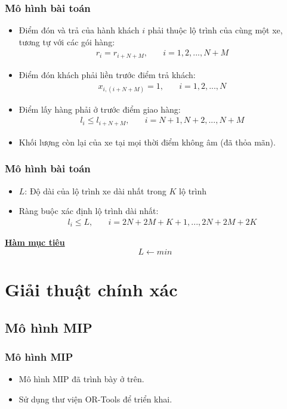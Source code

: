 \documentclass{beamer}
\begin{document}
	\begin{frame}
		\frametitle{Mô hình bài toán}
		\begin{itemize}
			\item Điểm đón và trả của hành khách $i$ phải thuộc lộ trình của cùng một xe, tương tự với các gói hàng:
				\begin{align}
				r_i = r_{i+N+M},\quad & i=1,2,...,N+M
				\end{align}
			\item Điểm đón khách phải liền trước điểm trả khách:
				\begin{align}
				x_{i,(i+N+M)} = 1,\quad & i=1,2,...,N
				\end{align}
			\item Điểm lấy hàng phải ở trước điểm giao hàng:
				\begin{align}
				l_i \leq l_{i+N+M},\quad & i=N+1,N+2,...,N+M
				\end{align}
			\item Khối lượng còn lại của xe tại mọi thời điểm không âm (đã thỏa mãn).
		\end{itemize}
	\end{frame}

	\begin{frame}
		\frametitle{Mô hình bài toán}
		\begin{itemize}
			\item $L$: Độ dài của lộ trình xe dài nhất trong $K$ lộ trình
			\item Ràng buộc xác định lộ trình dài nhất:
				\begin{align}
				l_i\leq L,\quad & i=2N+2M+K+1,...,2N+2M+2K
				\end{align}
		\end{itemize}
		\textbf{\underline{Hàm mục tiêu}}
			\begin{equation}
			L \leftarrow min
			\end{equation}
	\end{frame}

	
	\section{Giải thuật chính xác}
	
	
	\subsection{Mô hình MIP}
	\begin{frame}
		\frametitle{Mô hình MIP}
		\begin{itemize}
			\item Mô hình MIP đã trình bày ở trên.
			\item Sử dụng thư viện OR-Tools để triển khai.
		\end{itemize}
	\end{frame}
\end{document}
